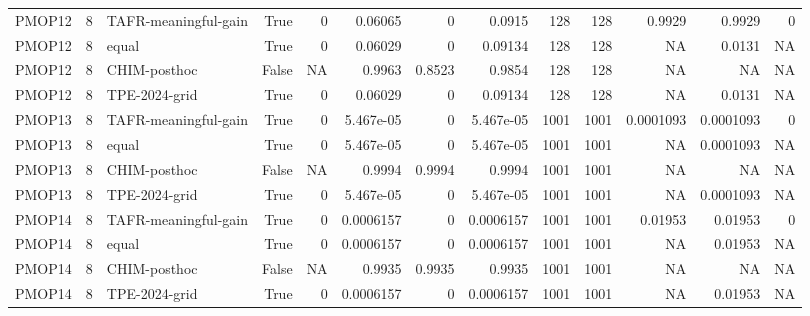 \begin{tabular}{lrlrrrrrrrrrr}
PMOP12 & 8 & TAFR-meaningful-gain & True & 0 & 0.06065 & 0 & 0.0915 & 128 & 128 & 0.9929 & 0.9929 & 0 \\
PMOP12 & 8 & equal & True & 0 & 0.06029 & 0 & 0.09134 & 128 & 128 & NA & 0.0131 & NA \\
PMOP12 & 8 & CHIM-posthoc & False & NA & 0.9963 & 0.8523 & 0.9854 & 128 & 128 & NA & NA & NA \\
PMOP12 & 8 & TPE-2024-grid & True & 0 & 0.06029 & 0 & 0.09134 & 128 & 128 & NA & 0.0131 & NA \\
PMOP13 & 8 & TAFR-meaningful-gain & True & 0 & 5.467e-05 & 0 & 5.467e-05 & 1001 & 1001 & 0.0001093 & 0.0001093 & 0 \\
PMOP13 & 8 & equal & True & 0 & 5.467e-05 & 0 & 5.467e-05 & 1001 & 1001 & NA & 0.0001093 & NA \\
PMOP13 & 8 & CHIM-posthoc & False & NA & 0.9994 & 0.9994 & 0.9994 & 1001 & 1001 & NA & NA & NA \\
PMOP13 & 8 & TPE-2024-grid & True & 0 & 5.467e-05 & 0 & 5.467e-05 & 1001 & 1001 & NA & 0.0001093 & NA \\
PMOP14 & 8 & TAFR-meaningful-gain & True & 0 & 0.0006157 & 0 & 0.0006157 & 1001 & 1001 & 0.01953 & 0.01953 & 0 \\
PMOP14 & 8 & equal & True & 0 & 0.0006157 & 0 & 0.0006157 & 1001 & 1001 & NA & 0.01953 & NA \\
PMOP14 & 8 & CHIM-posthoc & False & NA & 0.9935 & 0.9935 & 0.9935 & 1001 & 1001 & NA & NA & NA \\
PMOP14 & 8 & TPE-2024-grid & True & 0 & 0.0006157 & 0 & 0.0006157 & 1001 & 1001 & NA & 0.01953 & NA \\
\bottomrule
\end{tabular}
